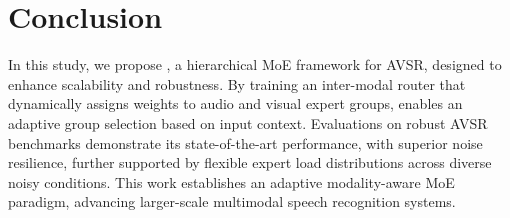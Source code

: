 \section{Conclusion}

In this study, we propose \ourmodel, a hierarchical MoE framework for AVSR, designed to enhance scalability and robustness. By training an inter-modal router that dynamically assigns weights to audio and visual expert groups, \ourmodel enables an adaptive group selection based on input context. Evaluations on robust AVSR benchmarks demonstrate its state-of-the-art performance, with superior noise resilience, further supported by flexible expert load distributions across diverse noisy conditions. This work establishes an adaptive modality-aware MoE paradigm, advancing larger-scale multimodal speech recognition systems.
